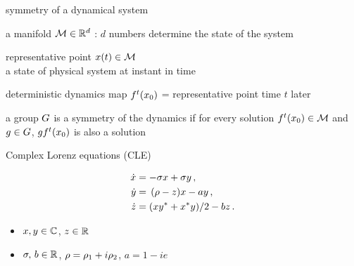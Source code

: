 \begin{frame}{symmetry of a dynamical system}

\begin{block}{\statesp}
a manifold ${\cal M} \in \mathbb{R}^{d}$ :
$d$ numbers determine the state of the system
\end{block}

\bigskip

\begin{block}{representative point }
$x(t) \in {\cal M}$
\\
a state of physical system at instant in time
\end{block}


\begin{block}{deterministic dynamics}
map ${f^t}({x_0})$ =
representative point time $t$ later
\end{block}
\begin{block}{a group $G$ is a {symmetry} of the dynamics if}
for every solution $f^t(x_0) \in {\cal M}$ and  $g \in G$,
$g f^t(x_0)$ is also a solution
\end{block}
\end{frame}


\begin{frame}{Complex Lorenz equations (CLE)}
  \begin{exampleblock}{}
	\begin{align*}
	  \dot{x} &= -\sigma x+ \sigma y \,,\nonumber \\ 
	  \dot{y} &=\, (\rho-z)x-a y\,, \nonumber \\ 
	  \dot{z} &= (x y^*+x^*y)/2 -b z\,.
	\end{align*}
  \end{exampleblock}
  \begin{block}{}
     \begin{itemize}
	  \item $x,y\in\mathbb{C}^{}$, $z\in\mathbb{R}^{}$
	  \item $\sigma,\,b \in \mathbb{R}^{}$, $\rho=\rho_1+i\rho_2$, $a=1-i e$
	  \end{itemize}
  \end{block}
\end{frame}


